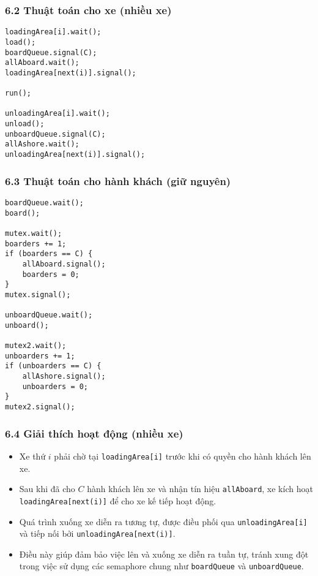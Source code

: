 \subsubsection*{6.2 Thuật toán cho xe (nhiều xe)}

\begin{lstlisting}
loadingArea[i].wait();
load();
boardQueue.signal(C);
allAboard.wait();
loadingArea[next(i)].signal();

run();

unloadingArea[i].wait();
unload();
unboardQueue.signal(C);
allAshore.wait();
unloadingArea[next(i)].signal();
\end{lstlisting}

\subsubsection*{6.3 Thuật toán cho hành khách (giữ nguyên)}

\begin{lstlisting}
boardQueue.wait();
board();

mutex.wait();
boarders += 1;
if (boarders == C) {
    allAboard.signal();
    boarders = 0;
}
mutex.signal();

unboardQueue.wait();
unboard();

mutex2.wait();
unboarders += 1;
if (unboarders == C) {
    allAshore.signal();
    unboarders = 0;
}
mutex2.signal();
\end{lstlisting}

\subsubsection*{6.4 Giải thích hoạt động (nhiều xe)}

\begin{itemize}
    \item Xe thứ $i$ phải chờ tại \texttt{loadingArea[i]} trước khi có quyền cho hành khách lên xe.
    \item Sau khi đã cho $C$ hành khách lên xe và nhận tín hiệu \texttt{allAboard}, xe kích hoạt \texttt{loadingArea[next(i)]} để cho xe kế tiếp hoạt động.
    \item Quá trình xuống xe diễn ra tương tự, được điều phối qua \texttt{unloadingArea[i]} và tiếp nối bởi \texttt{unloadingArea[next(i)]}.
    \item Điều này giúp đảm bảo việc lên và xuống xe diễn ra tuần tự, tránh xung đột trong việc sử dụng các semaphore chung như \texttt{boardQueue} và \texttt{unboardQueue}.
\end{itemize}


